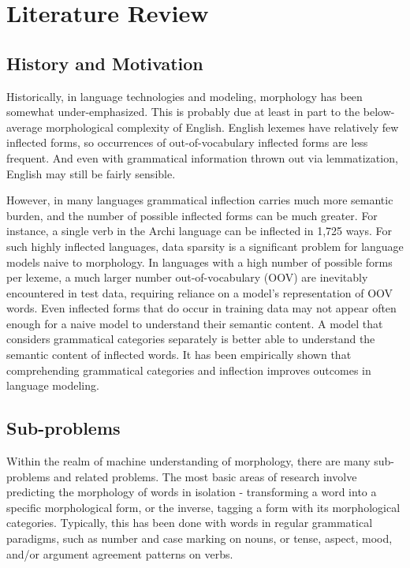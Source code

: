 \chapter{Literature Review}

\section{History and Motivation}

Historically, in language technologies and modeling, morphology has been somewhat under-emphasized. This is probably due at least in part to the below-average morphological complexity of English. \parencite{Cotterell2017} English lexemes have relatively few inflected forms, so occurrences of out-of-vocabulary inflected forms are less frequent. And even with grammatical information thrown out via lemmatization, English may still be fairly sensible.

However, in many languages grammatical inflection carries much more semantic burden, and the number of possible inflected forms can be much greater. For instance, a single verb in the Archi language can be inflected in 1,725 ways. \parencite{Cotterell2016} For such highly inflected languages, data sparsity is a significant problem for language models naive to morphology. In languages with a high number of possible forms per lexeme, a much larger number out-of-vocabulary (OOV) are inevitably encountered in test data, requiring reliance on a model's representation of OOV words. Even inflected forms that do occur in training data may not appear often enough for a naive model to understand their semantic content. A model that considers grammatical categories separately is better able to understand the semantic content of inflected words. \parencite{Cotterell2016} It has been empirically shown that comprehending grammatical categories and inflection improves outcomes in language modeling. \parencite{Faruqui2015}

\section{Sub-problems}

Within the realm of machine understanding of morphology, there are many sub-problems and related problems. The most basic areas of research involve predicting the morphology of words in isolation - transforming a word into a specific morphological form, or the inverse, tagging a form with its morphological categories. Typically, this has been done with words in regular grammatical paradigms, such as number and case marking on nouns, or tense, aspect, mood, and/or argument agreement patterns on verbs. 

